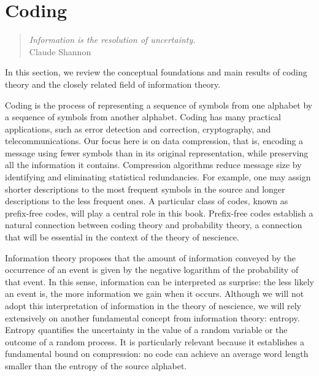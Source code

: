 %
%


\chapter{Coding}
\label{chap:Coding}

\begin{quote}
\begin{flushright}
\emph{Information is the resolution of uncertainty.}\\
Claude Shannon
\end{flushright}
\end{quote}
\bigskip

In this section, we review the conceptual foundations and main results of coding theory and the closely related field of information theory.

Coding is the process of representing a sequence of symbols from one alphabet by a sequence of symbols from another alphabet. Coding has many practical applications, such as error detection and correction, cryptography, and telecommunications. Our focus here is on data compression, that is, encoding a message using fewer symbols than in its original representation, while preserving all the information it contains. Compression algorithms reduce message size by identifying and eliminating statistical redundancies. For example, one may assign shorter descriptions to the most frequent symbols in the source and longer descriptions to the less frequent ones. A particular class of codes, known as prefix-free codes, will play a central role in this book. Prefix-free codes establish a natural connection between coding theory and probability theory, a connection that will be essential in the context of the theory of nescience.

Information theory proposes that the amount of information conveyed by the occurrence of an event is given by the negative logarithm of the probability of that event. In this sense, information can be interpreted as surprise: the less likely an event is, the more information we gain when it occurs. Although we will not adopt this interpretation of information in the theory of nescience, we will rely extensively on another fundamental concept from information theory: entropy. Entropy quantifies the uncertainty in the value of a random variable or the outcome of a random process. It is particularly relevant because it establishes a fundamental bound on compression: no code can achieve an average word length smaller than the entropy of the source alphabet.

